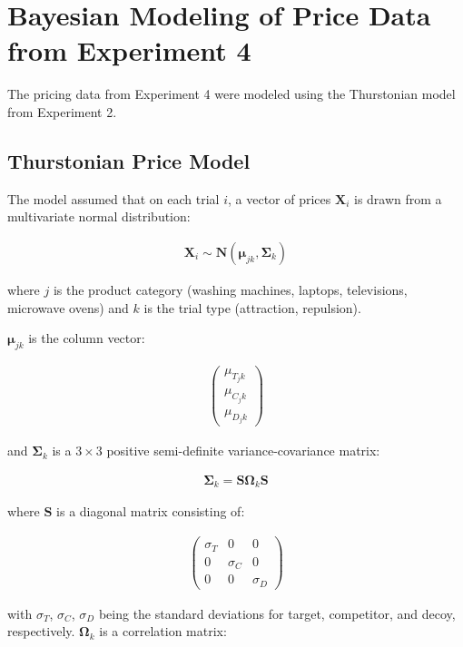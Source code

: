 \chapter{Bayesian Modeling of Price Data from Experiment 4}

The pricing data from Experiment 4 were modeled using the Thurstonian model from Experiment 2.

\section{Thurstonian Price Model}

The model assumed that on each trial $i$, a vector of prices $\bm{X}_{i}$ is drawn from a multivariate normal distribution:

\begin{align}
    \bm{X}_{i}\sim \bm{N}(\boldsymbol{\mu}_{jk},\boldsymbol{\Sigma}_{k})
\end{align}

where $j$ is the product category (washing machines, laptops, televisions, microwave ovens) and $k$ is the trial type (attraction, repulsion). 

$\boldsymbol{\mu}_{jk}$ is the column vector:

\begin{align}
   \begin{pmatrix}
      \mu_{T_jk} \\
      \mu_{C_jk} \\
      \mu_{D_jk}
\end{pmatrix}
   \label{eqn:mu_price}
\end{align}

and $\boldsymbol{\Sigma}_{k}$ is a $3 \times 3$ positive semi-definite variance-covariance matrix:

\begin{align}
   \boldsymbol{\Sigma}_{k}=\bm{S}\boldsymbol{\Omega}_{k}\bm{S}
\end{align}

where $\bm{S}$ is a diagonal matrix consisting of: 

\begin{align}
   \begin{pmatrix}
      \sigma_{T} & 0 & 0 \\
      0 & \sigma_{C} & 0 \\
      0 & 0 & \sigma_{D} 
   \end{pmatrix}
\end{align}

with $\sigma_{T}$, $\sigma_{C}$, $\sigma_{D}$ being the standard deviations for target, competitor, and decoy, respectively. $\boldsymbol{\Omega}_{k}$ is a correlation matrix:

